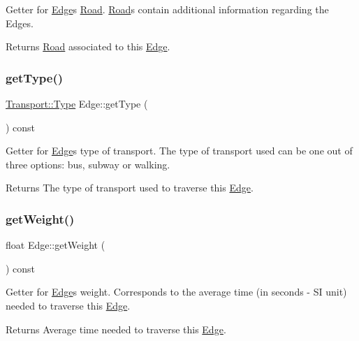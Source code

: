 Getter for \hyperlink{class_edge}{Edge}\textquotesingle{}s \hyperlink{class_road}{Road}. \hyperlink{class_road}{Road}\textquotesingle{}s contain additional information regarding the Edges.

\begin{DoxyReturn}{Returns}
\hyperlink{class_road}{Road} associated to this \hyperlink{class_edge}{Edge}. 
\end{DoxyReturn}
\hypertarget{class_edge_ad36b220701f80c199f9b2ed7bb79a22f}{}\label{class_edge_ad36b220701f80c199f9b2ed7bb79a22f} 
\subsubsection{\texorpdfstring{get\+Type()}{getType()}}
{\footnotesize\ttfamily \hyperlink{class_transport_a1879cecfed0d4238e5a7af6d085db317}{Transport\+::\+Type} Edge\+::get\+Type (\begin{DoxyParamCaption}{ }\end{DoxyParamCaption}) const}

Getter for \hyperlink{class_edge}{Edge}\textquotesingle{}s type of transport. The type of transport used can be one out of three options\+: bus, subway or walking.

\begin{DoxyReturn}{Returns}
The type of transport used to traverse this \hyperlink{class_edge}{Edge}. 
\end{DoxyReturn}
\hypertarget{class_edge_a873322923fa6340e17edb39b923f7d61}{}\label{class_edge_a873322923fa6340e17edb39b923f7d61} 
\subsubsection{\texorpdfstring{get\+Weight()}{getWeight()}}
{\footnotesize\ttfamily float Edge\+::get\+Weight (\begin{DoxyParamCaption}{ }\end{DoxyParamCaption}) const}

Getter for \hyperlink{class_edge}{Edge}\textquotesingle{}s weight. Corresponds to the average time (in seconds -\/ SI unit) needed to traverse this \hyperlink{class_edge}{Edge}.

\begin{DoxyReturn}{Returns}
Average time needed to traverse this \hyperlink{class_edge}{Edge}. 
\end{DoxyReturn}


